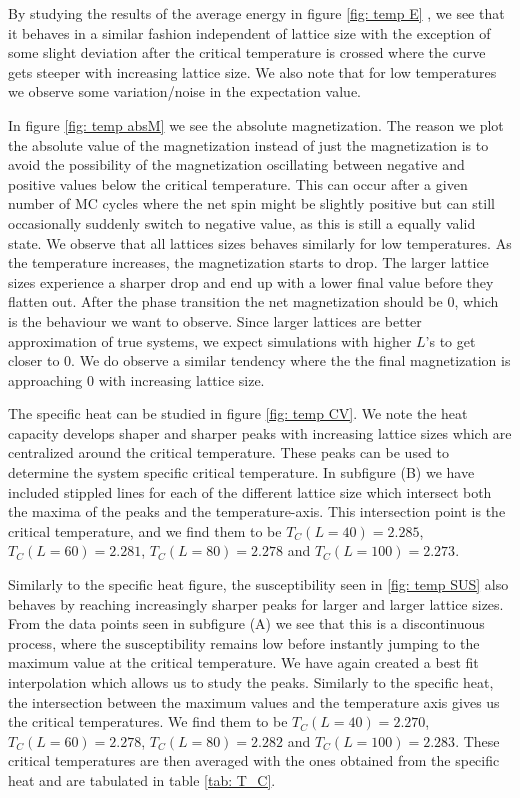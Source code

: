 \documentclass[a4paper, 10pt, reqno]{amsart}
\begin{document}
By studying the results of the average energy in figure \ref{fig: temp E} , we see that it behaves in a similar fashion independent of lattice size with the exception of some slight deviation after the critical temperature is crossed where the curve gets steeper with increasing lattice size. We also note that for low temperatures we observe some variation/noise in the expectation value.

In figure \ref{fig: temp absM} we see the absolute magnetization. The reason we plot the absolute value of the magnetization instead of just the magnetization is to avoid the possibility of the magnetization oscillating between negative and positive values below the critical temperature. This can occur after a given number of MC cycles where the net spin might be slightly positive but can still occasionally suddenly switch to negative value, as this is still a equally valid state. We observe that all lattices sizes behaves similarly for low temperatures. As the temperature increases, the magnetization starts to drop. The larger lattice sizes experience a sharper drop and end up with a lower final value before they flatten out. After the phase transition the net magnetization should be 0, which is the behaviour we want to observe. Since larger lattices are better approximation of true systems, we expect simulations with higher $L$'s to get closer to 0. We do observe a similar tendency where the the final magnetization is approaching 0 with increasing lattice size.

The specific heat can be studied in figure \ref{fig: temp CV}. We note the heat capacity develops shaper and sharper peaks with increasing lattice sizes which are centralized around the critical temperature. These peaks can be used to determine the system specific critical temperature. In subfigure (B) we have included stippled lines for each of the different lattice size which intersect both the maxima of the peaks and the temperature-axis. This intersection point is the critical temperature, and we find them to be $T_C(L=40)=2.285$, $T_C(L=60)=2.281$, $T_C(L=80)=2.278$ and $T_C(L=100)=2.273$. 

Similarly to the specific heat figure, the susceptibility seen in \ref{fig: temp SUS} also behaves by reaching increasingly sharper peaks for larger and larger lattice sizes. From the data points seen in subfigure (A) we see that this is a discontinuous process, where the susceptibility remains low before instantly jumping to the maximum value at the critical temperature. We have again created a best fit interpolation which allows us to study the peaks. Similarly to the specific heat, the intersection between the maximum values and the temperature axis gives us the critical temperatures. We find them to be $T_C(L=40)=2.270$, $T_C(L=60)=2.278$, $T_C(L=80)=2.282$ and $T_C(L=100)=2.283$. These critical temperatures are then averaged with the ones obtained from the specific heat and are tabulated in table \ref{tab: T_C}.
\end{document}
